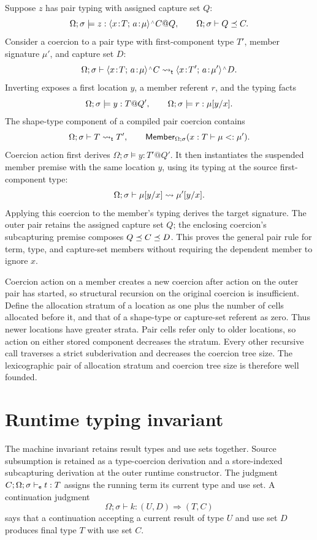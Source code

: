 \documentclass[acmsmall,screen,nonacm]{acmart}
\begin{document}
Suppose \(z\) has pair typing with assigned capture set \(Q\):
\[
 \Omega;\sigma\models
 z:\pairshape{x}{T}{a}{\mu}\capt C@Q,
 \qquad
 \Omega;\sigma\vdash Q\semleq C.
\]
Consider a coercion to a pair type with first-component type \(T'\), member
signature \(\mu'\), and capture set \(D\):
\[
 \Omega;\sigma\vdash
 \pairshape{x}{T}{a}{\mu}\capt C
 \tcoerce
 \pairshape{x}{T'}{a}{\mu'}\capt D.
\]
Inverting  exposes a first location \(y\), a member
referent \(r\), and the typing facts
\[
 \Omega;\sigma\models y:T@Q',
 \qquad
 \Omega;\sigma\models r:\mu[y/x].
\]
The shape-type component of a compiled pair coercion contains
\[
 \Omega;\sigma\vdash T\mathrel{\rightsquigarrow_{\mathsf t}} T',
 \qquad
 \mathsf{Member}_{\Omega;\sigma}(x:T\vdash\mu<:\mu').
\]
Coercion action first derives \(\Omega;\sigma\models y:T'@Q'\). It then
instantiates the suspended member premise with the same location \(y\),
using its typing at the source first-component type:
\[
 \Omega;\sigma\vdash
 \mu[y/x]\mathrel{\rightsquigarrow}\mu'[y/x].
\]
Applying this coercion to the member's typing derives the target signature.
The outer pair retains the assigned capture set \(Q\); the enclosing
coercion's subcapturing premise composes \(Q\mathrel{\preceq} C\mathrel{\preceq} D\). This proves the general pair
rule for term, type, and capture-set members without requiring the dependent
member to ignore \(x\).

Coercion action on a member creates a new coercion after action on the outer
pair has started, so structural recursion on the original coercion is
insufficient. Define the allocation stratum of a location as one plus the
number of cells allocated before it, and that of a shape-type or capture-set
referent as zero. Thus newer locations have greater
strata. Pair cells refer only to older locations, so action on either stored
component decreases the stratum. Every other recursive call traverses a
strict subderivation and decreases the coercion tree size. The lexicographic
pair of allocation stratum and coercion tree size is therefore well founded.

\section{Runtime typing invariant}
\label{sec:invariant}

The machine invariant retains result types and use sets together. Source
subsumption is retained as a type-coercion derivation and a store-indexed
subcapturing derivation at the outer runtime constructor. The judgment
\({C}; {\Omega;\sigma}\vdash_{\mathsf e} {t} : {T}\) assigns the running term its
current type and use set. A continuation judgment
\[
 \Omega;\sigma\vdash k:(U,D)\Rightarrow(T,C)
\]
says that a continuation accepting a current result of type \(U\) and use
set \(D\) produces final type \(T\) with use set \(C\).
\end{document}
